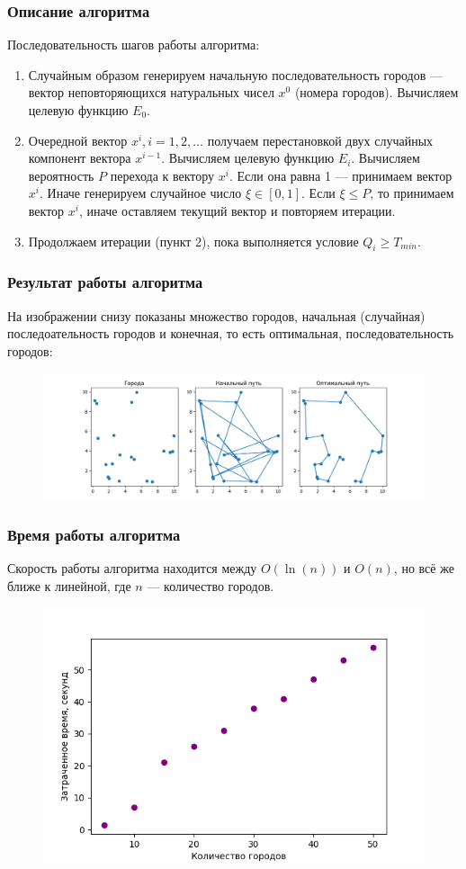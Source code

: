\documentclass[12pt]{beamer}
\begin{document}
\begin{frame}
\frametitle{Описание алгоритма}
Последовательность шагов работы алгоритма:
\begin{enumerate}
\item Случайным образом генерируем начальную последовательность городов --- вектор неповторяющихся натуральных чисел $x^{0}$ (номера городов). Вычисляем целевую функцию $E_{0}$.
\item Очередной вектор $x^{i}, i = 1, 2, \ldots$ получаем перестановкой двух случайных компонент вектора $x^{i-1}$. Вычисляем целевую функцию $E_{i}$. Вычисляем вероятность $P$ перехода к вектору $x^{i}$. Если она равна 1 --- принимаем вектор $x^{i}$. Иначе генерируем случайное число $\xi \in [0, 1]$. Если $\xi \leq P$, то принимаем вектор $x^{i}$, иначе оставляем текущий вектор и повторяем итерации.
\item Продолжаем итерации (пункт 2), пока выполняется условие $Q_{i} \geq T_{min}$. 
\end{enumerate}
\end{frame}

\begin{frame}
\frametitle{Результат работы алгоритма}
На изображении снизу показаны множество городов, начальная (случайная) последоательность городов и конечная, то есть оптимальная, последовательность городов:
\begin{figure}[H]
\centering
\includegraphics[width=1.0\linewidth]{TSP}
\end{figure}
\end{frame}

\begin{frame}
\frametitle{Время работы алгоритма}
Скорость работы алгоритма находится между $O(\ln(n))$ и $O(n)$, но всё же ближе к линейной, где $n$ --- количество городов.
\begin{figure}[H]
\centering
\includegraphics[width=0.85\linewidth]{Elapsed_time}
\end{figure}
\end{frame}
\end{document}
